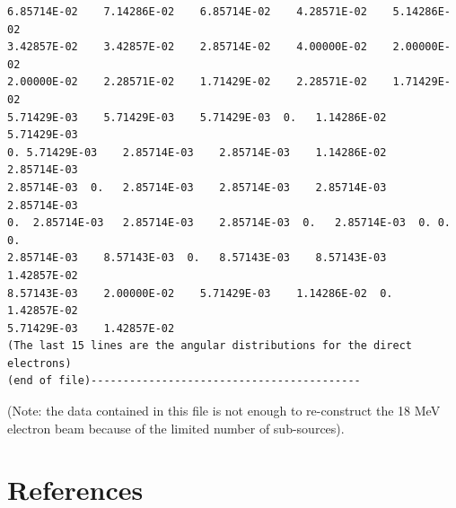 \documentclass[12pt,twoside]{article}
\begin{document}
\begin{verbatim}
6.85714E-02    7.14286E-02    6.85714E-02    4.28571E-02    5.14286E-02
3.42857E-02    3.42857E-02    2.85714E-02    4.00000E-02    2.00000E-02
2.00000E-02    2.28571E-02    1.71429E-02    2.28571E-02    1.71429E-02
5.71429E-03    5.71429E-03    5.71429E-03  0.   1.14286E-02    5.71429E-03
0. 5.71429E-03    2.85714E-03    2.85714E-03    1.14286E-02    2.85714E-03
2.85714E-03  0.   2.85714E-03    2.85714E-03    2.85714E-03    2.85714E-03
0.  2.85714E-03   2.85714E-03    2.85714E-03  0.   2.85714E-03  0. 0. 0.
2.85714E-03    8.57143E-03  0.   8.57143E-03    8.57143E-03    1.42857E-02
8.57143E-03    2.00000E-02    5.71429E-03    1.14286E-02  0.   1.42857E-02
5.71429E-03    1.42857E-02
(The last 15 lines are the angular distributions for the direct electrons)
(end of file)------------------------------------------
\end{verbatim}
(Note: the data contained in this file is not enough to re-construct the 18 MeV electron beam because of the limited number of sub-sources).

\section{References}
\renewcommand{\rightmark}{References}
\vspace*{-1cm}
\setlength{\baselineskip}{0.5cm}


\end{document}
